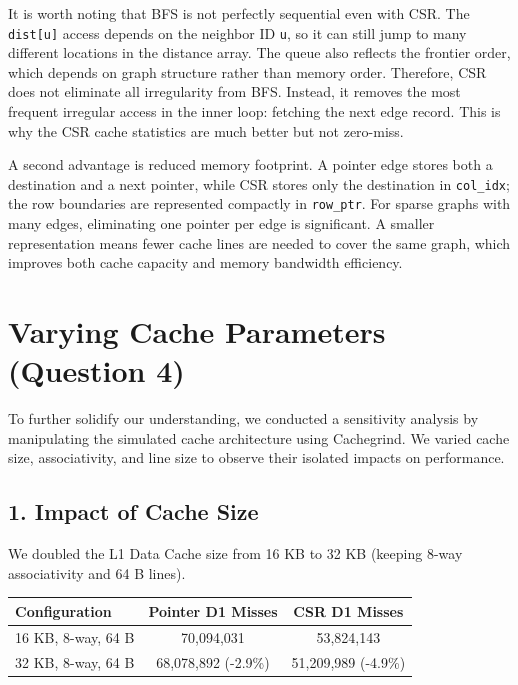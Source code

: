 \documentclass[11pt]{article}
\begin{document}
It is worth noting that BFS is not perfectly sequential even with CSR. The \texttt{dist[u]} access depends on the neighbor ID \texttt{u}, so it can still jump to many different locations in the distance array. The queue also reflects the frontier order, which depends on graph structure rather than memory order. Therefore, CSR does not eliminate all irregularity from BFS. Instead, it removes the most frequent irregular access in the inner loop: fetching the next edge record. This is why the CSR cache statistics are much better but not zero-miss.

A second advantage is reduced memory footprint. A pointer edge stores both a destination and a next pointer, while CSR stores only the destination in \texttt{col\_idx}; the row boundaries are represented compactly in \texttt{row\_ptr}. For sparse graphs with many edges, eliminating one pointer per edge is significant. A smaller representation means fewer cache lines are needed to cover the same graph, which improves both cache capacity and memory bandwidth efficiency.

\section{Varying Cache Parameters (Question 4)}

To further solidify our understanding, we conducted a sensitivity analysis by manipulating the simulated cache architecture using Cachegrind. We varied cache size, associativity, and line size to observe their isolated impacts on performance.

\subsection{1. Impact of Cache Size}
We doubled the L1 Data Cache size from 16 KB to 32 KB (keeping 8-way associativity and 64 B lines).

\begin{table}[H]
\centering
\begin{tabular}{@{}lcc@{}}
\toprule
\textbf{Configuration} & \textbf{Pointer D1 Misses} & \textbf{CSR D1 Misses} \\ \midrule
16 KB, 8-way, 64 B & 70,094,031 & 53,824,143 \\
32 KB, 8-way, 64 B & 68,078,892 (-2.9\%) & 51,209,989 (-4.9\%) \\ \bottomrule
\end{tabular}
\end{table}
\end{document}
